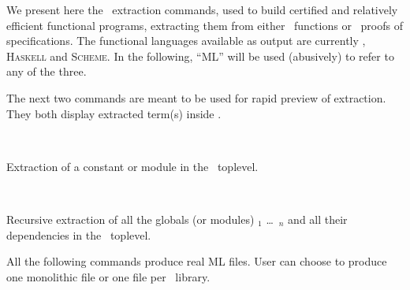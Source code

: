 \label{Extraction}

We present here the \Coq\ extraction commands, used to build certified
and relatively efficient functional programs, extracting them from
either \Coq\ functions or \Coq\ proofs of specifications. The
functional languages available as output are currently \ocaml{},
\textsc{Haskell} and \textsc{Scheme}.  In the following, ``ML'' will
be used (abusively) to refer to any of the three.



The next two commands are meant to be used for rapid preview of
extraction. They both display extracted term(s) inside \Coq.

\begin{description}
\item {} ~\par
  Extraction of a constant or module in the \Coq\ toplevel.

\item {} ~\par
  Recursive extraction of all the globals (or modules) \qualid$_1$ \dots\
  \qualid$_n$ and all their dependencies in the \Coq\ toplevel.
\end{description}


All the following commands produce real ML files. User can choose to produce
one monolithic file or one file per \Coq\ library. 

